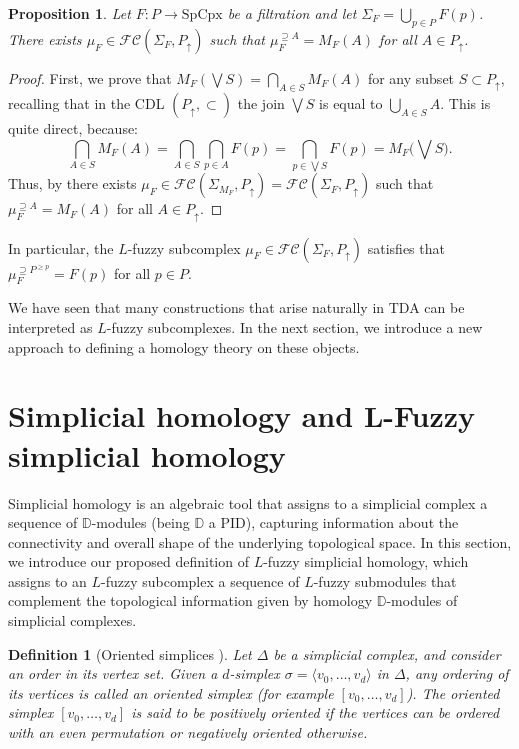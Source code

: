 \documentclass[a4paper,10pt]{article}
\newtheorem{definition}[theorem]{Definition}
\newtheorem{proposition}[theorem]{Proposition}
\newcommand{\bbd}{\mathbb{D}}
\newcommand{\calfc}{\mathcal{FC}}
\newcommand{\SpCpx}{\textrm{SpCpx}}
\begin{document}
\begin{proposition}\label{prop:any-filtration-is-fuzzy}
Let $F\colon P\rightarrow \SpCpx$ be a filtration and let $\Sigma_F=\bigcup_{p \in P}F(p)$. 
There exists \(\mu_F \in \calfc(\Sigma_F,P_\uparrow)\) such that 
$\mu_F^{\supseteq A} =M_F(A)$ for all $A \in P_\uparrow$. 
\end{proposition}
\begin{proof}
First, we prove that $M_F(\bigvee S)=\bigcap_{A\in S} M_F(A)$ for any subset $S \subset P_\uparrow$, recalling that in the CDL \((P_\uparrow,\subset)\) the join \(\bigvee S\) is equal to \(\bigcup_{A \in S} A\). This is quite direct, because:
\[
\bigcap_{A \in S} M_F(A) = \bigcap_{A \in S}\bigcap_{p \in A}F(p) = \bigcap_{p \in \bigvee S}F(p) = M_F\bigg(\bigvee S\bigg).
\]
Thus, by  there exists \(\mu_F \in \calfc(\Sigma_{M_F},P_\uparrow) = \calfc(\Sigma_{F},P_\uparrow)\) such that $\mu_F^{\supseteq A} =M_F(A)$ for all $A \in P_\uparrow$.
\end{proof}
In particular, the \(L\)-fuzzy subcomplex \(\mu_F \in \calfc(\Sigma_{F},P_\uparrow)\) satisfies that $\mu_F^{\supseteq P^{\geq p}}=F(p)$ for all $p \in P$. 

We have seen that many constructions that arise naturally in TDA can be interpreted as \(L\)-fuzzy subcomplexes. In the next section, we introduce a new approach to defining a homology theory on these objects.

\section{Simplicial homology and L-Fuzzy simplicial homology}
\label{sec:fuzhom}

Simplicial homology is an algebraic tool that assigns to a simplicial complex a sequence of \(\bbd\)-modules (being \(\bbd\) a PID), capturing information about the connectivity and overall shape of the underlying topological space. In this section, we  introduce our proposed definition of \(L\)-fuzzy simplicial homology, which assigns to an \(L\)-fuzzy subcomplex a sequence of \(L\)-fuzzy submodules that complement the topological information given by homology \(\bbd\)-modules of simplicial complexes.

\begin{definition}[Oriented simplices \cite{croom2012basic}]
\label{def:oriented}
Let \(\Delta\) be a simplicial complex, and consider an order in its vertex set. Given a \(d\)-simplex \(\sigma =\langle v_0,\dots,v_d\rangle\) in \(\Delta\), any ordering of its vertices is called an \emph{oriented simplex} (for example \([v_0, \dots, v_d]\)). The oriented simplex \([v_0, \dots, v_d]\) is said to be \emph{positively oriented} if the vertices can be ordered with an even permutation or \emph{negatively oriented} otherwise. 
\end{definition}
\end{document}
